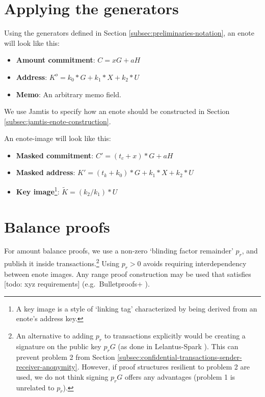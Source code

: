\section{Applying the generators}
\label{sec:applying-generators}

Using the generators defined in Section \ref{subsec:preliminaries-notation}, an enote will look like this:

\begin{itemize}
    \item \textbf{Amount commitment}: $C = x G + a H$
    \item \textbf{Address}: $K^o = k_0*G + k_1*X + k_2*U$
    \item \textbf{Memo}: An arbitrary memo field.
\end{itemize}

We use Jamtis to specify how an enote should be constructed in Section \ref{subsec:jamtis-enote-construction}.

An enote-image will look like this:

\begin{itemize}
    \item \textbf{Masked commitment}: $C' = (t_c + x)*G + a H$
    \item \textbf{Masked address}: $K' = (t_k + k_0)*G + k_1*X + k_2*U$
    \item \textbf{Key image}\footnote{A key image is a style of `linking tag' characterized by being derived from an enote's address key.}: $\tilde{K} = (k_2/k_1)*U$
\end{itemize}



\section{Balance proofs}
\label{sec:balance-proofs}

For amount balance proofs, we use a non-zero `blinding factor remainder' $p_r$, and publish it inside transactions.\footnote{An alternative to adding $p_r$ to transactions explicitly would be creating a signature on the public key $p_r G$ (as done in Lelantus-Spark \cite{lelantus-spark}). This can prevent problem 2 from Section \ref{subsec:confidential-transactions-sender-receiver-anonymity}. However, if proof structures resilient to problem 2 are used, we do not think signing $p_r G$ offers any advantages (problem 1 is unrelated to $p_r$).} Using $p_r > 0$ avoids requiring interdependency between enote images. Any range proof construction may be used that satisfies [todo: xyz requirements] (e.g.\ Bulletproofs+ \cite{bulletproofs_plus}).

